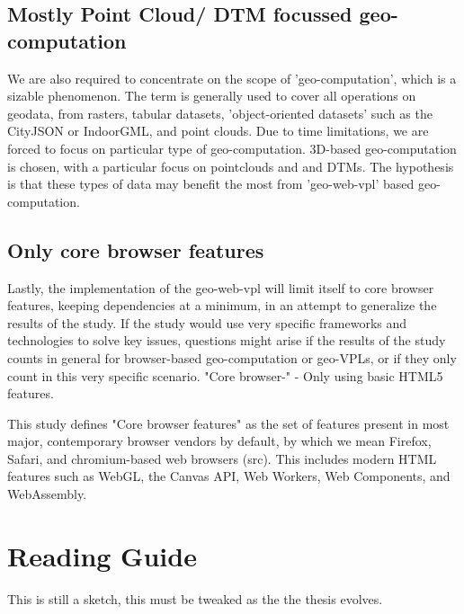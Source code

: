 \subsection*{Mostly Point Cloud/ DTM focussed geo-computation}
We are also required to concentrate on the scope of 'geo-computation', which is a sizable phenomenon.
The term is generally used to cover all operations on geodata, from rasters, tabular datasets, 'object-oriented datasets' such as the CityJSON or IndoorGML, and point clouds. 
Due to time limitations, we are forced to focus on particular type of geo-computation.
3D-based geo-computation is chosen, with a particular focus on pointclouds and and DTMs. 
The hypothesis is that these types of data may benefit the most from 'geo-web-vpl' based geo-computation.

\subsection*{Only core browser features}
Lastly, the implementation of the geo-web-vpl will limit itself to core browser features, keeping dependencies at a minimum, in an attempt to generalize the results of the study.
If the study would use very specific frameworks and technologies to solve key issues, questions might arise if the results of the study counts in general for browser-based geo-computation or geo-VPLs, or if they only count in this very specific scenario. 
"Core browser-"
- Only using basic HTML5 features.

This study defines "Core browser features" as the set of features present in most major, contemporary browser vendors by default, by which we mean Firefox, Safari, and chromium-based web browsers (src). 
This includes modern HTML features such as WebGL, the Canvas API, Web Workers, Web Components, and WebAssembly. 

\section{Reading Guide}

\begin{note}
  This is still a sketch, this must be tweaked as the the thesis evolves.
\end{note}

